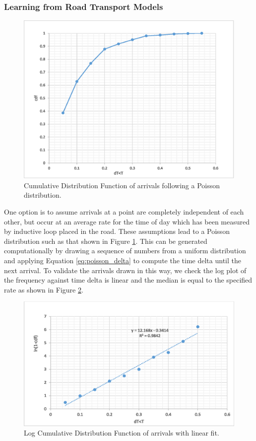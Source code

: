 \documentclass[]{article}
\begin{document}
\subsubsection{Learning from Road Transport Models}
\begin{figure}
	\centering
	\includegraphics[width=0.9\linewidth]{poisson_cdf.eps}
	\caption{Cumulative Distribution Function of arrivals following a Poisson distribution.}
	\label{fig:poisson_cdf}
\end{figure}
One option is to assume arrivals at a point are completely independent of each other, but occur at an average rate for the time of day which has been measured by inductive loop placed in the road. These assumptions lead to a Poisson distribution such as that shown in Figure \ref{fig:poisson_cdf}. This can be generated computationally by drawing a sequence of numbers from a uniform distribution and applying Equation \ref{eq:poisson_delta} to compute the time delta until the next arrival. To validate the arrivals drawn in this way, we check the log plot of the frequency against time delta is linear and the median is equal to the specified rate as shown in Figure \ref{fig:1_minus_ln_cdf_arr}.   
\begin{figure}
	\centering
	\includegraphics[width=0.9\linewidth]{ln(1-cdf)poisson_arr.eps}
	\caption{Log Cumulative Distribution Function of arrivals with linear fit.}
	\label{fig:1_minus_ln_cdf_arr}
\end{figure}
\end{document}
